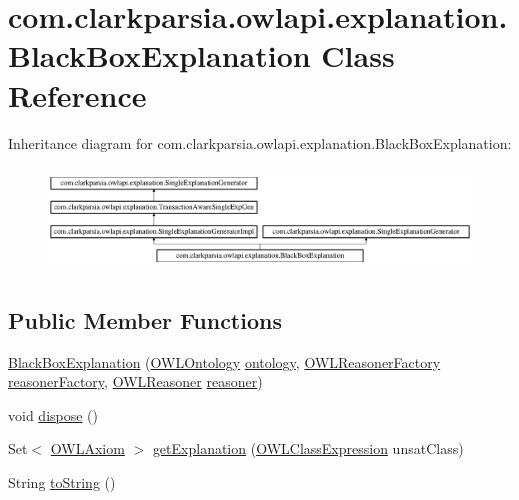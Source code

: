 \hypertarget{classcom_1_1clarkparsia_1_1owlapi_1_1explanation_1_1_black_box_explanation}{\section{com.\-clarkparsia.\-owlapi.\-explanation.\-Black\-Box\-Explanation Class Reference}
\label{classcom_1_1clarkparsia_1_1owlapi_1_1explanation_1_1_black_box_explanation}
}
Inheritance diagram for com.\-clarkparsia.\-owlapi.\-explanation.\-Black\-Box\-Explanation\-:\begin{figure}[H]
\begin{center}
\leavevmode
\includegraphics[height=2.772277cm]{classcom_1_1clarkparsia_1_1owlapi_1_1explanation_1_1_black_box_explanation}
\end{center}
\end{figure}
\subsection*{Public Member Functions}
\begin{DoxyCompactItemize}
\item 
\hyperlink{classcom_1_1clarkparsia_1_1owlapi_1_1explanation_1_1_black_box_explanation_aa526fb4ee10c6747f88118d16025abaf}{Black\-Box\-Explanation} (\hyperlink{interfaceorg_1_1semanticweb_1_1owlapi_1_1model_1_1_o_w_l_ontology}{O\-W\-L\-Ontology} \hyperlink{classcom_1_1clarkparsia_1_1owlapi_1_1explanation_1_1_single_explanation_generator_impl_ac4bb20805a66ec91e52ae4dc7d3dd6d4}{ontology}, \hyperlink{interfaceorg_1_1semanticweb_1_1owlapi_1_1reasoner_1_1_o_w_l_reasoner_factory}{O\-W\-L\-Reasoner\-Factory} \hyperlink{classcom_1_1clarkparsia_1_1owlapi_1_1explanation_1_1_single_explanation_generator_impl_a2eacc90779bb1e8895675560a1d3b57a}{reasoner\-Factory}, \hyperlink{interfaceorg_1_1semanticweb_1_1owlapi_1_1reasoner_1_1_o_w_l_reasoner}{O\-W\-L\-Reasoner} \hyperlink{classcom_1_1clarkparsia_1_1owlapi_1_1explanation_1_1_single_explanation_generator_impl_a9df949455124847c9685dc24a31f225b}{reasoner})
\item 
void \hyperlink{classcom_1_1clarkparsia_1_1owlapi_1_1explanation_1_1_black_box_explanation_a7ada52175ba5adff6b4710b55436b349}{dispose} ()
\item 
Set$<$ \hyperlink{interfaceorg_1_1semanticweb_1_1owlapi_1_1model_1_1_o_w_l_axiom}{O\-W\-L\-Axiom} $>$ \hyperlink{classcom_1_1clarkparsia_1_1owlapi_1_1explanation_1_1_black_box_explanation_a917461a1cd8681b95fe3e8ceb10db7d8}{get\-Explanation} (\hyperlink{interfaceorg_1_1semanticweb_1_1owlapi_1_1model_1_1_o_w_l_class_expression}{O\-W\-L\-Class\-Expression} unsat\-Class)
\item 
String \hyperlink{classcom_1_1clarkparsia_1_1owlapi_1_1explanation_1_1_black_box_explanation_aba80f0a660a8082b7c16e0604d4eb24a}{to\-String} ()
\end{DoxyCompactItemize}

